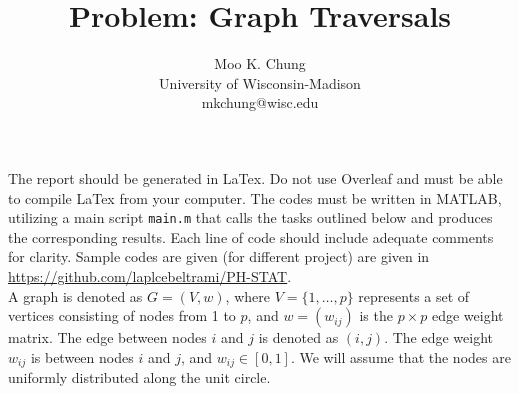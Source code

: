 \documentclass[10pt]{article} %
\begin{document}
\title{Problem: Graph Traversals}
\author{Moo K. Chung\\
University of Wisconsin-Madison\\
mkchung@wisc.edu}
\maketitle \thispagestyle{empty}
 
 The report should be generated in LaTex. Do not use Overleaf and must be able to compile LaTex from your computer. 
 The codes must be written in MATLAB, utilizing a main script \texttt{main.m} that calls the tasks outlined below and produces the corresponding results. Each line of code should include adequate comments for clarity. Sample codes are given (for different project) are given in \url{https://github.com/laplcebeltrami/PH-STAT}.\\




A graph is denoted as \( G = (V, w) \), where \( V = \{1, \ldots, p\} \) represents a set of vertices consisting of nodes from 1 to \( p \), and \( w = (w_{ij}) \) is the \( p \times p \) edge weight matrix. The edge between nodes $i$ and $j$ is denoted as $(i,j)$. The edge weight \( w_{ij} \) is between nodes \( i \) and \( j \), and $w_{ij} \in [0,1]$. We will assume that the nodes are uniformly distributed along the unit circle. 
\end{document}
